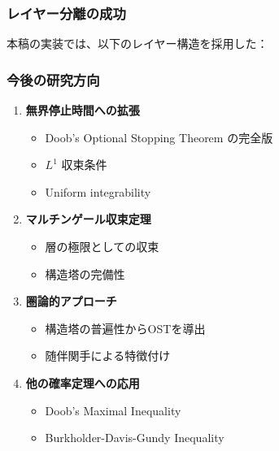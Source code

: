 \documentclass[a4paper,12pt]{ltjsarticle}
\theoremstyle{definition}
\begin{document}
\subsubsection{レイヤー分離の成功}

本稿の実装では、以下のレイヤー構造を採用した：
\begin{center}
\end{center}

\subsubsection{今後の研究方向}

\begin{enumerate}
  \item \textbf{無界停止時間への拡張}
    \begin{itemize}
      \item Doob's Optional Stopping Theorem の完全版
      \item $L^1$ 収束条件
      \item Uniform integrability
    \end{itemize}

  \item \textbf{マルチンゲール収束定理}
    \begin{itemize}
      \item 層の極限としての収束
      \item 構造塔の完備性
    \end{itemize}

  \item \textbf{圏論的アプローチ}
    \begin{itemize}
      \item 構造塔の普遍性からOSTを導出
      \item 随伴関手による特徴付け
    \end{itemize}

  \item \textbf{他の確率定理への応用}
    \begin{itemize}
      \item Doob's Maximal Inequality
      \item Burkholder-Davis-Gundy Inequality
    \end{itemize}
\end{enumerate}
\end{document}

